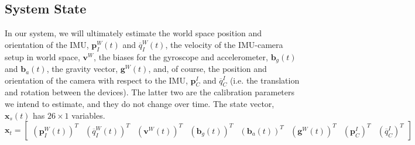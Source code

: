 \documentclass[letterpaper]{article}
\newcommand{\bb}[1]{\mathbf{#1}}
\begin{document}
\subsection{System State}
In our system, we will ultimately estimate the world space position
and orientation of the IMU, $\bb{p}_I^W(t)$ and
${\overline{q}}_I^W(t)$, the velocity of the IMU-camera setup in world
space, $\bb{v}^W$, the biases for the gyroscope and accelerometer,
$\bb{b}_g(t)$ and $\bb{b}_a(t)$, the gravity vector, $\bb{g}^W(t)$,
and, of course, the position and orientation of the camera with
respect to the IMU, $\bb{p}_C^I$ and $\overline{q}_C^I$ (i.e. the
translation and rotation between the devices). The latter two are the
calibration parameters we intend to estimate, and they do not change
over time. The state vector, $\bb{x}_s(t)$ has $26 \times 1$
variables.
\begin{equation}
\bb{x}_t=\begin{bmatrix} (\bb{p}_I^W(t))^T & ({\overline{q}}_I^W(t))^T  & (\bb{v}^W(t))^T  & (\bb{b}_g(t))^T &  (\bb{b}_a(t))^T & (\bb{g}^W(t))^T  & (\bb{p}_C^I)^T & (\overline{q}_C^I)^T\end{bmatrix}
\label{eq:UKF-state}
\end{equation}
\end{document}
